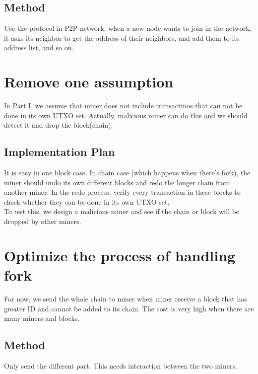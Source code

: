\documentclass{article}
\begin{document}
\begin{spacing}{1.1}
\subsection{Method}
Use the protocol in P2P network, when a new node wants to join in the network, it asks its neighbor to get the address of their neighbors, and add them
to its address list, and so on.

\section{Remove one assumption}
In Part I, we assume that miner does not include transactinos that can not be done in its own UTXO set. Actually, malicious miner can do this and we
should detect it and drop the block(chain).
\subsection{Implementation Plan}
It is easy in one block case. In chain case (which happens when there's fork), the miner should undo its own different blocks and redo the longer 
chain from another miner. In the redo process, verify every transaction in these blocks to check whether they can be done in its own UTXO set.
\\
To test this, we design a malicious miner and see if the chain or block will be dropped by other miners.

\section{Optimize the process of handling fork}
For now, we send the whole chain to miner when miner receive a block that has greater ID and cannot be added to its chain.
The cost is very high when there are many miners and blocks.
\subsection{Method}
Only send the different part. This needs interaction between the two miners.
\end{spacing}
\end{document}

